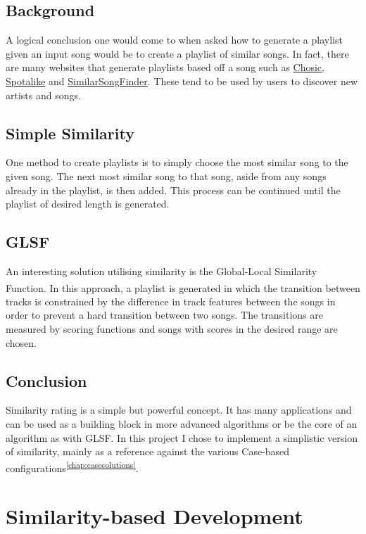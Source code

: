 \documentclass[a4paper, 12pt]{report}
\begin{document}
\section{Background}
A logical conclusion one would come to when asked how to generate a playlist given an input song would be to create a playlist of similar songs.
In fact, there are many websites that generate playlists based off a song such as \href{https://www.chosic.com/playlist-generator/}{Chosic}, \href{https://spotalike.com/}{Spotalike}
and \href{https://www.similarsongfinder.com/}{SimilarSongFinder}. These tend to be used by users to discover new artists and songs.

\section{Simple Similarity}
One method to create playlists is to simply choose the most similar song to the given song.
The next most similar song to that song, aside from any songs already in the playlist, is then added.
This process can be continued until the playlist of desired length is generated.

\section{GLSF}
An interesting solution utilising similarity is the Global-Local Similarity Function\textsuperscript{\cite{glsf}}. In this approach, a playlist is generated
in which the transition between tracks is constrained by the difference in track features between the songs in order to prevent a hard transition between two songs.
The transitions are measured by scoring functions and songs with scores in the desired range are chosen.

\section{Conclusion}
Similarity rating is a simple but powerful concept. It has many applications and can be used as a building block in more advanced algorithms
or be the core of an algorithm as with GLSF. In this project I chose to implement a simplistic version of similarity, mainly as a reference against
the various Case-based configurations\textsuperscript{\ref{chap:casesolutions}}.



\chapter{Similarity-based Development}\label{chap:simdev}
\end{document}
